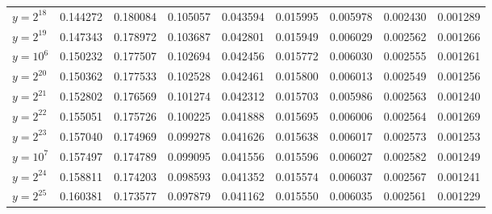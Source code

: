 \documentclass{article}
\theoremstyle{definition}
\begin{document}
\begin{table}[h!]
{\begin{tabular}{l|rrrrrrrr}
            $y = 2^{18}$             & 0.144272 & 0.180084              & 0.105057              & 0.043594              & 0.015995              & 0.005978              & 0.002430              & 0.001289              \\
            $y = 2^{19}$             & 0.147343 & 0.178972              & 0.103687              & 0.042801              & 0.015949              & 0.006029              & 0.002562              & 0.001266              \\
            \hline
            $y = 10^{6}$             & 0.150232 & 0.177507              & 0.102694              & 0.042456              & 0.015772              & 0.006030              & 0.002555              & 0.001261              \\
            \hline
            $y = 2^{20}$             & 0.150362 & 0.177533              & 0.102528              & 0.042461              & 0.015800              & 0.006013              & 0.002549              & 0.001256              \\
            $y = 2^{21}$             & 0.152802 & 0.176569              & 0.101274              & 0.042312              & 0.015703              & 0.005986              & 0.002563              & 0.001240              \\
            $y = 2^{22}$             & 0.155051 & 0.175726              & 0.100225              & 0.041888              & 0.015695              & 0.006006              & 0.002564              & 0.001269              \\
            $y = 2^{23}$             & 0.157040 & 0.174969              & 0.099278              & 0.041626              & 0.015638              & 0.006017              & 0.002573              & 0.001253              \\
            \hline
            $y = 10^{7}$             & 0.157497 & 0.174789              & 0.099095              & 0.041556              & 0.015596              & 0.006027              & 0.002582              & 0.001249              \\
            \hline
            $y = 2^{24}$             & 0.158811 & 0.174203              & 0.098593              & 0.041352              & 0.015574              & 0.006037              & 0.002567              & 0.001241              \\
            $y = 2^{25}$             & 0.160381 & 0.173577              & 0.097879              & 0.041162              & 0.015550              & 0.006035              & 0.002561              & 0.001229              \\

\end{tabular}}
\end{table}
\end{document}
